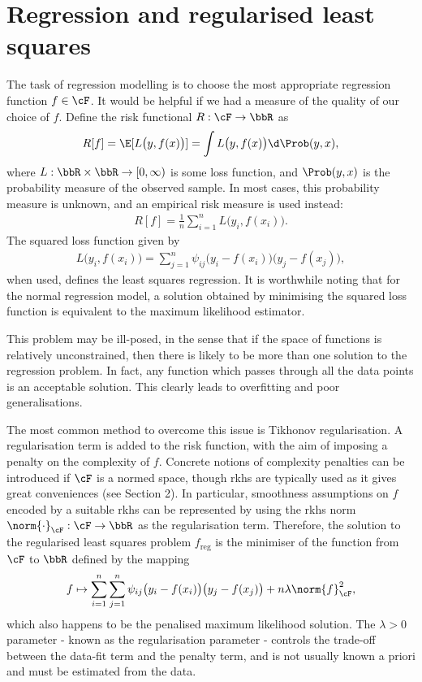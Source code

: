 \newpage

\section{Regression and regularised least squares}

The task of regression modelling is to choose the most appropriate regression function $f \in \cF$. 
It would be helpful if we had a measure of the quality of our choice of $f$. 
Define the risk functional $R:\cF \to \bbR$ as
\begin{align}
  R[f] = \E[L\big(y,f(x)\big)] = \int L\big(y,f(x)\big) \d \Prob(y,x),
\end{align}
where $L:\bbR \times \bbR \to [0,\infty)$ is some loss function, and $\Prob(y,x)$ is the probability measure of the observed sample.
In most cases, this probability measure is unknown, and an empirical risk measure is used instead:
\begin{align}
  R[f] = \frac{1}{n} \sum_{i=1}^n L\big(y_i,f(x_i)\big).
\end{align}
The squared loss function given by
\begin{align}
  L\big(y_i,f(x_i)\big) = \sum_{j=1}^n \psi_{ij} \big(y_i - f(x_i)\big)\big(y_j - f(x_j)\big),
\end{align} 
when used, defines the least squares regression. 
It is worthwhile noting that for the normal regression model, a solution obtained by minimising the squared loss function is equivalent to the maximum likelihood estimator.
 
This problem may be ill-posed, in the sense that if the space of functions is relatively unconstrained, then there is likely to be more than one solution to the regression problem. 
In fact, any function which passes through all the data points is an acceptable solution. 
This clearly leads to overfitting and poor generalisations. 
 
 
The most common method to overcome this issue is Tikhonov regularisation. 
A regularisation term is added to the risk function, with the aim of imposing a penalty on the complexity of $f$.
Concrete notions of complexity penalties can be introduced if $\cF$ is a normed space, though \gls{rkhs} are typically used as it gives great conveniences (see Section 2).   
In particular, smoothness assumptions on $f$ encoded by a suitable \gls{rkhs} can be represented by using the \gls{rkhs} norm $\norm{\cdot}_\cF:\cF \to \bbR$ as the regularisation term. 
Therefore, the solution to the regularised least squares problem $f_{\text{reg}}$ is the minimiser of the function from $\cF$ to $\bbR$ defined by the mapping
\begin{align}\label{eq:penfunctional}
  f \mapsto \sum_{i=1}^n \sum_{j=1}^n \psi_{ij} \big(y_i - f(x_i)\big)\big(y_j - f(x_j)\big) + n\lambda \norm{f}^2_\cF,
\end{align}
which also happens to be the penalised maximum likelihood solution. The $\lambda > 0$ parameter - known as the regularisation parameter - controls the trade-off between the data-fit term and the penalty term, and is not usually known a priori and must be estimated from the data.


